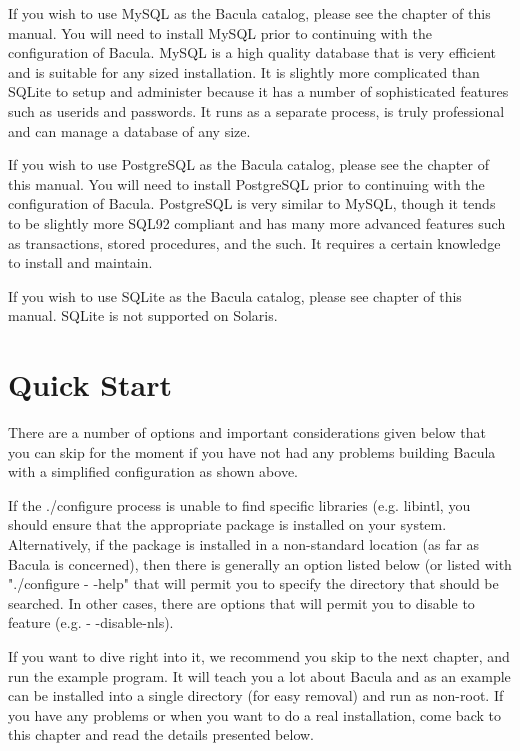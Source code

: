 If you wish to use MySQL as the Bacula catalog, please see the 
 chapter of
this manual. You will need to install MySQL prior to continuing with the
configuration of Bacula. MySQL is a high quality database that is very
efficient and is suitable for any sized installation. It is slightly more
complicated than SQLite to setup and administer because it has a number of
sophisticated features such as userids and passwords. It runs as a separate
process, is truly professional and can manage a database of any size. 

If you wish to use PostgreSQL as the Bacula catalog, please see the 
chapter of this manual. You will need to install PostgreSQL prior to
continuing with the configuration of Bacula. PostgreSQL is very similar to
MySQL, though it tends to be slightly more SQL92 compliant and has many more
advanced features such as transactions, stored procedures, and the such. It
requires a certain knowledge to install and maintain. 

If you wish to use SQLite as the Bacula catalog, please see 
 chapter of
this manual. SQLite is not supported on Solaris.

\section{Quick Start}

There are a number of options and important considerations given below
that you can skip for the moment if you have not had any problems building
Bacula with a simplified configuration as shown above. 
      
If the ./configure process is unable to find specific libraries (e.g.    
libintl, you should ensure that the appropriate package is installed on
your system. Alternatively, if the package is installed in a non-standard
location (as far as Bacula is concerned), then there is generally an
option listed below (or listed with "./configure {-} {-}help" that will
permit you to specify the directory that should be searched. In other
cases, there are options that will permit you to disable to feature 
(e.g. {-} {-}disable-nls).

If you want to dive right into it, we recommend you skip to the next chapter,
and run the example program. It will teach you a lot about Bacula and as an
example can be installed into a single directory (for easy removal) and run as
non-root. If you have any problems or when you want to do a real installation,
come back to this chapter and read the details presented below. 

